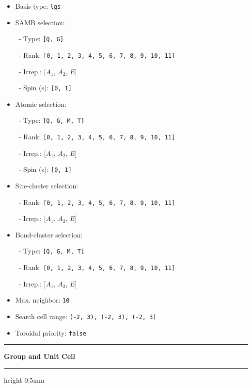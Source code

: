 \documentclass[fleqn,10pt,landscape]{jsarticle}
\begin{document}
\begin{itemize}
\item Basis type: \texttt{lgs}

\item SAMB selection:

\, - Type: \texttt{[Q, G]}

\, - Rank: \texttt{[0, 1, 2, 3, 4, 5, 6, 7, 8, 9, 10, 11]}

\, - Irrep.: [$A_{1}$, $A_{2}$, $E$]

\, - Spin (s): \texttt{[0, 1]}

\item Atomic selection:

\, - Type: \texttt{[Q, G, M, T]}

\, - Rank: \texttt{[0, 1, 2, 3, 4, 5, 6, 7, 8, 9, 10, 11]}

\, - Irrep.: [$A_{1}$, $A_{2}$, $E$]

\, - Spin (s): \texttt{[0, 1]}

\item Site-cluster selection:

\, - Rank: \texttt{[0, 1, 2, 3, 4, 5, 6, 7, 8, 9, 10, 11]}

\, - Irrep.: [$A_{1}$, $A_{2}$, $E$]

\item Bond-cluster selection:

\, - Type: \texttt{[Q, G, M, T]}

\, - Rank: \texttt{[0, 1, 2, 3, 4, 5, 6, 7, 8, 9, 10, 11]}

\, - Irrep.: [$A_{1}$, $A_{2}$, $E$]

\item Max. neighbor: \texttt{10}

\item Search cell range: \texttt{(-2, 3), (-2, 3), (-2, 3)}

\item Toroidal priority: \texttt{false}

\end{itemize}
\vspace{5mm}
\noindent \rule[0.5mm]{5mm}{0.5mm}\hspace{3mm}\textbf{Group and Unit Cell}\hspace{3mm}\leaders\hrule height 0.5mm\hfill\kern0pt
\vspace{3mm}
\end{document}
